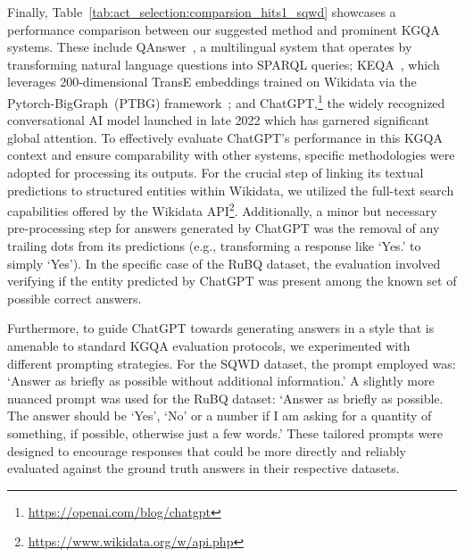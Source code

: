 Finally, Table~\ref{tab:act_selection:comparsion_hits1_sqwd} showcases a performance comparison between our suggested method and prominent KGQA systems. These include QAnswer~\cite{diefenbach2020towards}, a multilingual system that operates by transforming natural language questions into SPARQL queries; KEQA~\cite{Huang2019KnowledgeGE}, which leverages 200-dimensional TransE embeddings trained on Wikidata via the Pytorch-BigGraph~(PTBG) framework~\cite{pbg}; and ChatGPT,\footnote{\url{https://openai.com/blog/chatgpt}} the widely recognized conversational AI model launched in late 2022 which has garnered significant global attention. To effectively evaluate ChatGPT's performance in this KGQA context and ensure comparability with other systems, specific methodologies were adopted for processing its outputs. For the crucial step of linking its textual predictions to structured entities within Wikidata, we utilized the full-text search capabilities offered by the Wikidata API\footnote{\url{https://www.wikidata.org/w/api.php}}. Additionally, a minor but necessary pre-processing step for answers generated by ChatGPT was the removal of any trailing dots from its predictions (e.g., transforming a response like `Yes.' to simply `Yes'). In the specific case of the RuBQ dataset, the evaluation involved verifying if the entity predicted by ChatGPT was present among the known set of possible correct answers.

Furthermore, to guide ChatGPT towards generating answers in a style that is amenable to standard KGQA evaluation protocols, we experimented with different prompting strategies. For the SQWD dataset, the prompt employed was: `Answer as briefly as possible without additional information.' A slightly more nuanced prompt was used for the RuBQ dataset: `Answer as briefly as possible. The answer should be `Yes', `No' or a number if I am asking for a quantity of something, if possible, otherwise just a few words.' These tailored prompts were designed to encourage responses that could be more directly and reliably evaluated against the ground truth answers in their respective datasets.

